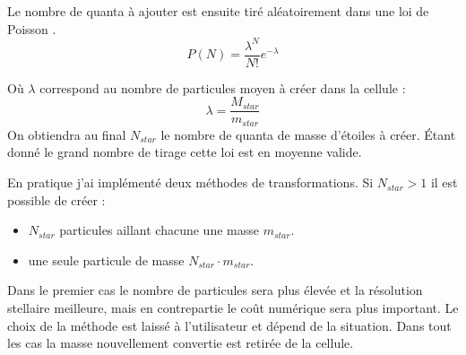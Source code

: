 Le nombre de quanta à ajouter est ensuite tiré aléatoirement dans une loi de Poisson \citep{rasera_history_2006}.
\begin{equation}
	P(N) = \frac{\lambda^N}{N!} e^{-\lambda}
\end{equation}

Où $\lambda$ correspond au nombre de particules moyen à créer dans la cellule :
\begin{equation}
\lambda = \frac{ M_{star}}{m_{star}}
\end{equation}
On obtiendra au final $N_{star}$ le nombre de quanta de masse d'étoiles à créer.
Étant donné le grand nombre de tirage cette loi est en moyenne valide.

En pratique j'ai implémenté deux méthodes de transformations.
Si  $N_{star}>1$ il est possible de créer : 
\begin{itemize}
\item  $N_{star}$ particules aillant chacune une masse  $m_{star}$.
\item une seule particule de masse  $N_{star} \cdot m_{star}$.
\end{itemize}

Dans le premier cas le nombre de particules sera plus élevée et la résolution stellaire meilleure, mais en contrepartie le coût numérique sera plus important.
Le choix de la méthode est laissé à l'utilisateur et dépend de la situation.
Dans tout les cas la masse nouvellement convertie est retirée de la cellule.




